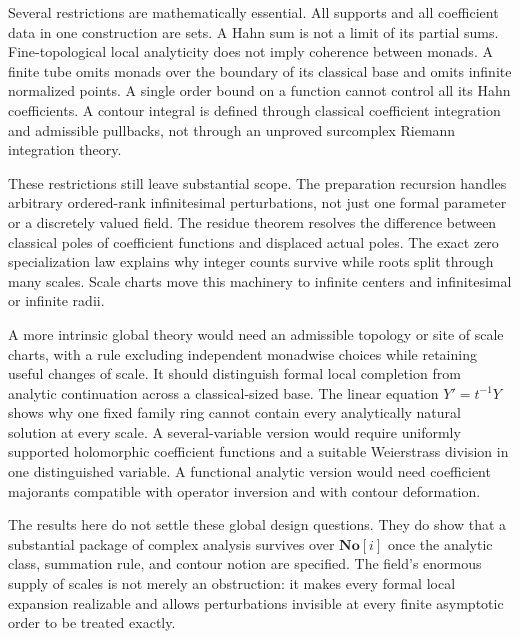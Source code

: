 \documentclass[11pt,a4paper]{article}
\theoremstyle{definition}
\theoremstyle{remark}
\newcommand{\No}{\mathbf{No}}
\begin{document}
Several restrictions are mathematically essential. All supports and
all coefficient data in one construction are sets. A Hahn sum is not
a limit of its partial sums. Fine-topological local analyticity does
not imply coherence between monads. A finite tube omits monads over
the boundary of its classical base and omits infinite normalized
points. A single order bound on a function cannot control all its
Hahn coefficients. A contour integral is defined through classical
coefficient integration and admissible pullbacks, not through an
unproved surcomplex Riemann integration theory.

These restrictions still leave substantial scope. The preparation
recursion handles arbitrary ordered-rank infinitesimal perturbations,
not just one formal parameter or a discretely valued field. The
residue theorem resolves the difference between classical poles of
coefficient functions and displaced actual poles. The exact zero
specialization law explains why integer counts survive while roots
split through many scales. Scale charts move this machinery to
infinite centers and infinitesimal or infinite radii.

A more intrinsic global theory would need an admissible topology or
site of scale charts, with a rule excluding independent monadwise
choices while retaining useful changes of scale. It should distinguish
formal local completion from analytic continuation across a
classical-sized base. The linear equation $Y'=t^{-1}Y$ shows why
one fixed family ring cannot contain every analytically natural
solution at every scale. A several-variable version would require
uniformly supported holomorphic coefficient functions and a suitable
Weierstrass division in one distinguished variable. A functional
analytic version would need coefficient majorants compatible with
operator inversion and with contour deformation.

The results here do not settle these global design questions. They do
show that a substantial package of complex analysis survives over
$\No[i]$ once the analytic class, summation rule, and contour notion
are specified. The field's enormous supply of scales is not merely an
obstruction: it makes every formal local expansion realizable and
allows perturbations invisible at every finite asymptotic order to
be treated exactly.

\appendix
\end{document}
